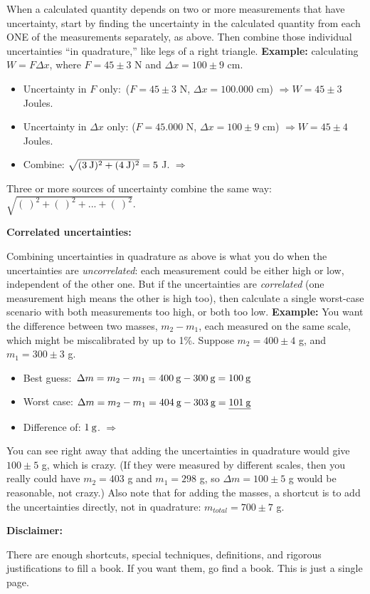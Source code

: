 When a calculated quantity depends on two or more measurements that have uncertainty, start by finding the uncertainty in the calculated quantity from each ONE of the measurements separately, as above.  Then combine those individual uncertainties ``in quadrature,'' like legs of a right triangle. \textbf{Example:} calculating $W=F \Delta x$, where $F=45\pm3$ N and $\Delta x=100\pm9$ cm. 
\begin{itemize} \itemsep1pt
\vspace{-0.35cm}
	\item Uncertainty in $F$ only:   \:\:\,($F=45\pm3$ N, $\Delta x=100.000$ cm) $\Longrightarrow W=45\pm3$ Joules.
	\item Uncertainty in $\Delta x$ only: ($F=45.000$ N, $\Delta x=100\pm9$ cm) $\Longrightarrow W=45\pm4$ Joules.
\vspace{-0.10cm}
		\item Combine: $\sqrt{(3 \:\rm{J})^2+(4 \:\rm{J} )^2 } =5$ J.  $\Longrightarrow$ 
\end{itemize}
\vspace{-0.35cm}
Three or more sources of uncertainty combine the same way: $\sqrt{(\:)^2 + (\:)^2 +...+ (\:)^2 }$.
\vspace{+0.15cm}

\textbf{Correlated uncertainties:}
\vspace{-0.15cm}

Combining uncertainties in quadrature as above is what you do when the uncertainties are \textit{uncorrelated}: each measurement could be either high or low, independent of the other one.  But if the uncertainties are \textit{correlated} (one measurement high means the other is high too), then calculate a single worst-case scenario with both measurements too high, or both too low. \textbf{Example:} You want the difference between two masses, $m_2-m_1$, each measured on the same scale, which might be miscalibrated by up to 1\%.  Suppose $m_2=400\pm4$ g, and $m_1=300\pm3$ g. 
\begin{itemize} \itemsep1pt
\vspace{-0.35cm}
	\item Best guess: $\,\Delta m=m_2-m_1=400 \:\rm{ g}-300 \:\rm{ g} = 100 \:\rm{ g}$
	\item Worst case: $  \Delta m=m_2-m_1=404 \:\rm{ g}-303 \:\rm{ g} = \underline{ 101 \:\rm{ g}}$
\vspace{-0.15cm}
	\item Difference of: \hspace{151pt}                        $1 \:\rm{g}$. $\Longrightarrow$ 
\end{itemize}
\vspace{-0.35cm}
You can see right away that adding the uncertainties in quadrature would give $100\pm5$ g, which is crazy.  (If they were measured by different scales, then you really could have $m_2=403$ g and $m_1=298$ g, so $\Delta m=100\pm 5$ g would be reasonable, not crazy.)  Also note that for adding the masses, a shortcut is to add the uncertainties directly, not in quadrature: $m_{total}=700\pm 7$ g.
\vspace{+0.15cm}

\textbf{Disclaimer:}
\vspace{-0.15cm}

There are enough shortcuts, special techniques, definitions, and rigorous justifications to fill a book. If you want them, go find a book.  This is just a single page.


